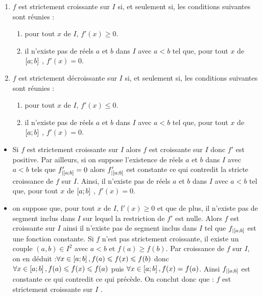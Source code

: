 \begin{defprop}
    \begin{enumerate}
        \item  \(f\) est strictement croissante sur \(I\) si, et seulement si, les conditions suivantes sont réunies :
        \begin{enumerate}
            \item pour tout \(x\) de \(I\), \(f '(x) \geq 0\).
            \item il n’existe pas de réels \(a\) et \(b\) dans \(I\) avec \(a < b\) tel que, pour tout \(x\) de \(\left[a;b\right]\) , \(f '(x) = 0\).
        \end{enumerate}

        \item \(f\) est strictement décroissante sur \(I\) si, et seulement si, les conditions suivantes sont réunies :
        \begin{enumerate}
            \item pour tout \(x\) de \(I\), \(f '(x) \leq 0\).
            \item il n’existe pas de réels \(a\) et \(b\) dans \(I\) avec \(a < b\) tel que, pour tout \(x\) de \(\left[a;b\right]\) , \(f '(x) = 0\).
        \end{enumerate}
    \end{enumerate}
\end{defprop}

\begin{dem}
    \begin{itemize}
        
        \item \impdir Si \(f\) est strictement croissante sur \(I\) alors \(f\) est croissante sur \(I\) donc \(f '\) est positive. Par ailleurs, si on suppose l’existence de réels \(a\) et \(b\) dans \(I\) avec \(a < b\) tels que \(f '_{|\left[a;b\right]} = 0\) alors \(f '_{ |\left[a;b\right]}\) est constante ce qui contredit la stricte croissance de \(f\) sur \(I\). Ainsi, il n’existe pas de réels \(a\) et \(b\) dans \(I\) avec \(a < b\) tel que, pour tout \(x\) de \(\left[a;b\right]\) , \(f '(x) = 0\).
        \item \imprec  on suppose que, pour tout \(x\) de \(I\), f\( '(x) \geq 0\) et que de plus, il n’existe pas de segment inclus dans \(I\) sur lequel la restriction de \(f '\) est nulle. Alors \(f\) est croissante sur \(I\) ainsi il n’existe pas de segment inclus dans \(I\) tel que \(f_{ |\left[a;b\right]}\) est une fonction constante. Si \(f\) n’est pas strictement croissante, il existe un couple \((a, b) \in I^2\) avec \( a < b\) et \(f (a) \geq f (b)\). Par croissance de \(f\) sur \(I\), on en déduit :\( \forall x \in \left[a;b\right] , f (a) \leqslant f (x) \leqslant f (b)\) donc \(\forall x \in \left[a;b\right] , f (a) \leqslant f (x) \leqslant f (a)\) puis \(\forall x \in \left[a;b\right] , f (x) = f (a)\). Ainsi \(f_{ |\left[a;b\right]}\) est constante ce qui contredit ce qui précède. On conclut donc que : \(f\) est strictement croissante sur \(I\) .
    \end{itemize}
\end{dem}

